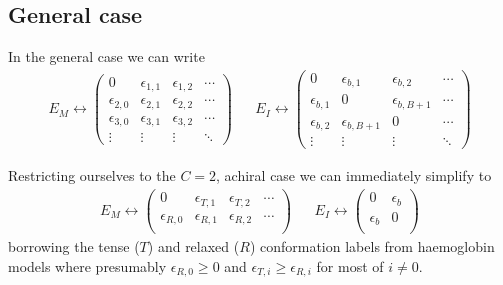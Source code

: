 \documentclass[11pt]{article}
\begin{document}
\subsection{General case}
In the general case we can write
\begin{align}
    E_M \leftrightarrow \begin{pmatrix}
        0 & \epsilon_{1,1} & \epsilon_{1,2} & \cdots \\
        \epsilon_{2,0} & \epsilon_{2,1} & \epsilon_{2,2} & \cdots \\
        \epsilon_{3,0} & \epsilon_{3,1} & \epsilon_{3,2} & \cdots \\
        \vdots & \vdots & \vdots & \ddots
    \end{pmatrix}
    &&
    E_I \leftrightarrow \begin{pmatrix}
        0 & \epsilon_{b,1} & \epsilon_{b,2} & \cdots \\
        \epsilon_{b,1} & 0 & \epsilon_{b,B+1} & \cdots \\
        \epsilon_{b,2} & \epsilon_{b,B+1} & 0 & \cdots \\
        \vdots & \vdots & \vdots & \ddots
    \end{pmatrix}
\end{align}

Restricting ourselves to the $C=2$, achiral case we can immediately simplify to
\begin{align}
    E_M \leftrightarrow \begin{pmatrix}
        0 & \epsilon_{T,1} & \epsilon_{T,2} & \cdots \\
        \epsilon_{R,0} & \epsilon_{R,1} & \epsilon_{R,2} & \cdots \\
    \end{pmatrix}
    &&
    E_I \leftrightarrow \begin{pmatrix}
        0 & \epsilon_b \\
        \epsilon_b & 0 \\
    \end{pmatrix}
\end{align}
borrowing the tense ($T$) and relaxed ($R$) conformation labels from haemoglobin models where presumably $\epsilon_{R,0} \geq 0$ and $\epsilon_{T,i} \geq \epsilon_{R,i}$ for most of $i \neq 0$.
\end{document}
